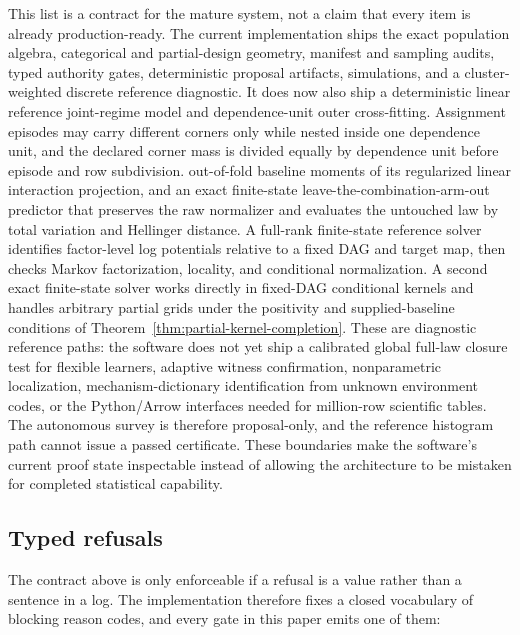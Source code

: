 \documentclass[11pt]{article}
\begin{document}
This list is a contract for the mature system, not a claim that every item is
already production-ready.  The current implementation ships the exact
population algebra, categorical and partial-design geometry, manifest and
sampling audits, typed authority gates, deterministic proposal artifacts,
simulations, and a cluster-weighted discrete reference diagnostic.  It does
now also ship a deterministic linear reference joint-regime model and
dependence-unit outer cross-fitting.  Assignment episodes may carry different
corners only while nested inside one dependence unit, and the declared corner
mass is divided equally by dependence unit before episode and row subdivision.
out-of-fold baseline moments of its regularized linear interaction projection, and an exact
finite-state leave-the-combination-arm-out predictor that preserves the raw
normalizer and evaluates the untouched law by total variation and Hellinger
distance.  A full-rank finite-state reference solver identifies factor-level
log potentials relative to a fixed DAG and target map, then checks Markov
factorization, locality, and conditional normalization.  A second exact
finite-state solver works directly in fixed-DAG conditional kernels and handles
arbitrary partial grids under the positivity and supplied-baseline conditions
of Theorem~\ref{thm:partial-kernel-completion}.  These are diagnostic
reference paths: the software does not yet ship
a calibrated global full-law closure test for flexible learners, adaptive
witness confirmation, nonparametric localization, mechanism-dictionary
identification from unknown environment codes, or the Python/Arrow interfaces
needed for million-row scientific tables.  The
autonomous survey is therefore proposal-only, and the reference histogram path
cannot issue a passed certificate.  These boundaries make the software's
current proof state inspectable instead of allowing the architecture to be
mistaken for completed statistical capability.

\subsection{Typed refusals}

The contract above is only enforceable if a refusal is a value rather than a
sentence in a log. The implementation therefore fixes a closed vocabulary of
blocking reason codes, and every gate in this paper emits one of them:
\end{document}
